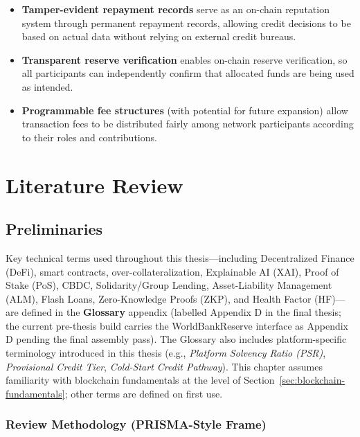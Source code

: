 \documentclass[12pt,a4paper]{report}
\begin{document}
\begin{itemize}[noitemsep]
\item \textbf{Tamper-evident repayment records} serve as an on-chain reputation system through permanent repayment records, allowing credit decisions to be based on actual data without relying on external credit bureaus.
\item \textbf{Transparent reserve verification} enables on-chain reserve verification, so all participants can independently confirm that allocated funds are being used as intended.
\item \textbf{Programmable fee structures} (with potential for future expansion) allow transaction fees to be distributed fairly among network participants according to their roles and contributions.
\end{itemize}


\chapter{Literature Review}

\section{Preliminaries}

Key technical terms used throughout this thesis---including Decentralized Finance (DeFi), smart contracts, over-collateralization, Explainable AI (XAI), Proof of Stake (PoS), CBDC, Solidarity/Group Lending, Asset-Liability Management (ALM), Flash Loans, Zero-Knowledge Proofs (ZKP), and Health Factor (HF)---are defined in the \textbf{Glossary} appendix (labelled Appendix D in the final thesis; the current pre-thesis build carries the WorldBankReserve interface as Appendix D pending the final assembly pass). The Glossary also includes platform-specific terminology introduced in this thesis (e.g., \textit{Platform Solvency Ratio (PSR)}, \textit{Provisional Credit Tier}, \textit{Cold-Start Credit Pathway}). This chapter assumes familiarity with blockchain fundamentals at the level of Section~\ref{sec:blockchain-fundamentals}; other terms are defined on first use.

\subsection{Review Methodology (PRISMA-Style Frame)}
\label{sec:lit-prisma}
\end{document}
